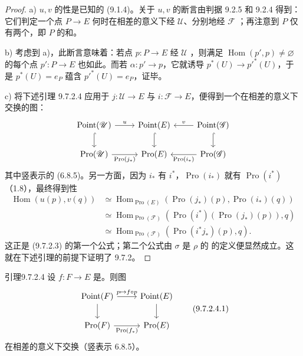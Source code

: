 \begin{proof}
a) $u,v$ 的性是已知的 (9.1.4)。关于 $u,v$ 的断言由判据 9.2.5 和 9.2.4 得到：它们判定一个点 $P\to E$ 何时在相差的意义下经 $\mathscr U$、分别地经 $\mathscr F$ ；再注意到 $P$ 仅有两个，即 $P$ 的和。

b) 考虑到 a)，此断言意味着：若点 $p:P\to E$ 经 $\mathscr U$ ，则满足 $\operatorname{Hom}(p',p)\ne\varnothing$ 的每个点 $p':P\to E$ 也如此。而若 $\alpha:p'\to p$，它就诱导 $p^*(U)\to p'^*(U)$，于是 $p^*(U)=e_P$ 蕴含 $p'^*(U)=e_P$，证毕。

c) 将下述引理 9.7.2.4 应用于 $j:\mathscr U\to E$ 与 $i:\mathscr F\to E$，便得到一个在相差的意义下交换的图：
\[
\begin{tikzcd}
\operatorname{Point}(\mathscr U)\arrow[r,"u"]\arrow[d,hook]&\operatorname{Point}(E)\arrow[d,hook]&\operatorname{Point}(\mathscr G)\arrow[l,"v"']\arrow[d,hook]\\
\operatorname{Pro}(\mathscr U)\arrow[r,"\operatorname{Pro}(j_*)"']&\operatorname{Pro}(E)&\operatorname{Pro}(\mathscr G)\arrow[l,"\operatorname{Pro}(i_*)"]
\end{tikzcd}
\]
其中竖表示的 (6.8.5)。另一方面，因为 $i_*$ 有 $i^*$，$\operatorname{Pro}(i_*)$ 就有 $\operatorname{Pro}(i^*)$（1.8），最终得到性
\[
\begin{aligned}
\operatorname{Hom}(u(p),v(q))
&\simeq\operatorname{Hom}_{\operatorname{Pro}(E)}(\operatorname{Pro}(j_*)(p),\operatorname{Pro}(i_*)(q))\\
&\simeq\operatorname{Hom}_{\operatorname{Pro}(\mathscr F)}(\operatorname{Pro}(i^*)(\operatorname{Pro}(j_*)(p)),q)\\
&\simeq\operatorname{Hom}_{\operatorname{Pro}(\mathscr F)}(\operatorname{Pro}(i^*j_*)(p),q).
\end{aligned}
\]
这正是 (9.7.2.3) 的第一个公式；第二个公式由 $\sigma$ 是 $\rho$ 的 的定义便显然成立。这就在下述引理的前提下证明了 9.7.2。
\end{proof}
\begin{SGAresult}{引理}{9.7.2.4}
设 $f:F\to E$ 是。则图
\[
\begin{tikzcd}
\operatorname{Point}(F)\arrow[r,"p\mapsto f\circ p"]\arrow[d]&\operatorname{Point}(E)\arrow[d]\\
\operatorname{Pro}(F)\arrow[r,"\operatorname{Pro}(f_*)"']&\operatorname{Pro}(E)
\end{tikzcd}\tag{9.7.2.4.1}
\]
在相差的意义下交换（竖表示 6.8.5）。
\end{SGAresult}
